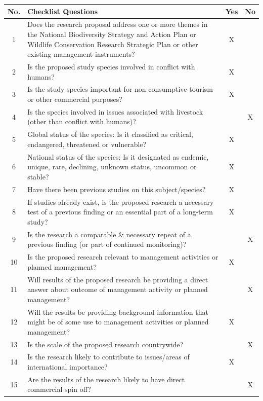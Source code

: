 \documentclass[12pt,a4paper]{article}
\begin{document}
{\small
\renewcommand{\arraystretch}{1.1}
\begin{center}
\begin{tabular}{|c|p{11.6cm}|c|c|}
\hline
\textbf{No.} & \textbf{Checklist Questions} & \textbf{Yes} & \textbf{No} \\ \hline
1 & Does the research proposal address one or more themes in the National Biodiversity Strategy and Action Plan or Wildlife Conservation Research Strategic Plan or other existing management instruments? & X & \\ \hline
2 & Is the proposed study species involved in conflict with humans? & X & \\ \hline
3 & Is the study species important for non-consumptive tourism or other commercial purposes? & X & \\ \hline
4 & Is the species involved in issues associated with livestock (other than conflict with humans)? & & X \\ \hline
5 & Global status of the species: Is it classified as critical, endangered, threatened or vulnerable? & X & \\ \hline
6 & National status of the species: Is it designated as endemic, unique, rare, declining, unknown status, uncommon or stable? & X & \\ \hline
7 & Have there been previous studies on this subject/species? & X & \\ \hline
8 & If studies already exist, is the proposed research a necessary test of a previous finding or an essential part of a long-term study? & X & \\ \hline
9 & Is the research a comparable \& necessary repeat of a previous finding (or part of continued monitoring)? & & X \\ \hline
10 & Is the proposed research relevant to management activities or planned management? & X & \\ \hline
11 & Will results of the proposed research be providing a direct answer about outcome of management activity or planned management? & & X \\ \hline
12 & Will the results be providing background information that might be of some use to management activities or planned management? & X & \\ \hline
13 & Is the scale of the proposed research countrywide? & & X \\ \hline
14 & Is the research likely to contribute to issues/areas of international importance? & X & \\ \hline
15 & Are the results of the research likely to have direct commercial spin off? & & X \\ \hline

\end{tabular}
\end{center}}
\end{document}

